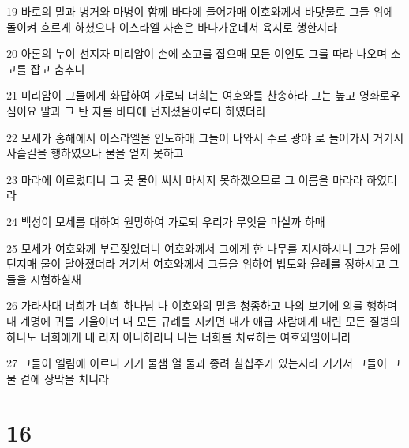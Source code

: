 \par 19 바로의 말과 병거와 마병이 함께 바다에 들어가매 여호와께서 바닷물로 그들 위에 돌이켜 흐르게 하셨으나 이스라엘 자손은 바다가운데서 육지로 행한지라
\par 20 아론의 누이 선지자 미리암이 손에 소고를 잡으매 모든 여인도 그를 따라 나오며 소고를 잡고 춤추니
\par 21 미리암이 그들에게 화답하여 가로되 너희는 여호와를 찬송하라 그는 높고 영화로우심이요 말과 그 탄 자를 바다에 던지셨음이로다 하였더라
\par 22 모세가 홍해에서 이스라엘을 인도하매 그들이 나와서 수르 광야 로 들어가서 거기서 사흘길을 행하였으나 물을 얻지 못하고
\par 23 마라에 이르렀더니 그 곳 물이 써서 마시지 못하겠으므로 그 이름을 마라라 하였더라
\par 24 백성이 모세를 대하여 원망하여 가로되 우리가 무엇을 마실까 하매
\par 25 모세가 여호와께 부르짖었더니 여호와께서 그에게 한 나무를 지시하시니 그가 물에 던지매 물이 달아졌더라 거기서 여호와께서 그들을 위하여 법도와 율례를 정하시고 그들을 시험하실새
\par 26 가라사대 너희가 너희 하나님 나 여호와의 말을 청종하고 나의 보기에 의를 행하며 내 계명에 귀를 기울이며 내 모든 규례를 지키면 내가 애굽 사람에게 내린 모든 질병의 하나도 너희에게 내 리지 아니하리니 나는 너희를 치료하는 여호와임이니라
\par 27 그들이 엘림에 이르니 거기 물샘 열 둘과 종려 칠십주가 있는지라 거기서 그들이 그 물 곁에 장막을 치니라

\chapter{16}


